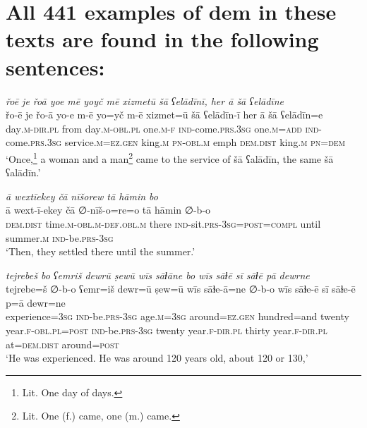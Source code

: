 \chapter{All 441 examples of dem in these texts are found in the following sentences:}

\ea \label{ZB.1}
\textit{řoē je řoā yoe mē yoyč mē xizmetū šā ʕelādīnī, her ā šā ʕelādīne} \\ 
\gll řo-ē je řo-ā yo-e m-ē yo=yč m-ē xizmet=ū šā ʕelādīn-ī her ā šā ʕelādīn=e \\ 
 day\textsc{.m}\textsc{-dir}\textsc{.pl} from day\textsc{.m}\textsc{-obl}\textsc{.pl} one\textsc{.m}\textsc{-f} \textsc{ind-}come\textsc{.prs}\textsc{.3sg} one\textsc{.m}\textsc{=add} \textsc{ind-}come\textsc{.prs}\textsc{.3sg} service\textsc{.m}\textsc{\textsc{=ez.gen}} king\textsc{.m} \textsc{pn}\textsc{-obl}\textsc{.m} emph \textsc{dem.dist} king\textsc{.m} \textsc{pn}\textsc{=dem} \\ 
\glt `Once,\footnote{Lit. One day of days.} a woman and a man\footnote{Lit. One (f.) came, one (m.) came.} came to the service of šā ʕalādīn, the same šā ʕalādīn.'
\z 
 
\ea \label{ZB.6}
\textit{ā wextīekey čā nīšorew tā hāmin bo} \\ 
\gll ā wext-ī-ekey čā ∅-nīš-o=re=o tā hāmin ∅-b-o \\ 
 \textsc{dem.dist} time\textsc{.m}\textsc{-obl}\textsc{.m}\textsc{-def}\textsc{.obl}\textsc{.m} there \textsc{ind-}sit\textsc{.prs}\textsc{-3sg}\textsc{=\textsc{post}}\textsc{=compl} until summer\textsc{.m} \textsc{ind-}be\textsc{.prs}\textsc{-3sg} \\ 
\glt `Then, they settled there until the summer.'
\z 
 
\ea \label{ZB.12}
\textit{tejrebeš bo ʕemriš dewrū ṣewū wīs sāɫāne bo wīs sāɫē sī sāɫē pā dewrne} \\ 
\gll tejrebe=š ∅-b-o ʕemr=iš dewr=ū ṣew=ū wīs sāɫe-ā=ne ∅-b-o wīs sāɫe-ē sī sāɫe-ē p=ā dewr=ne \\ 
 experience\textsc{=3sg} \textsc{ind-}be\textsc{.prs}\textsc{-3sg} age\textsc{.m}\textsc{=3sg} around\textsc{\textsc{=ez.gen}} hundred=and twenty year\textsc{.f}\textsc{-obl}\textsc{.pl}\textsc{=\textsc{post}} \textsc{ind-}be\textsc{.prs}\textsc{-3sg} twenty year\textsc{.f}\textsc{-dir}\textsc{.pl} thirty year\textsc{.f}\textsc{-dir}\textsc{.pl} at=\textsc{dem.dist} around\textsc{=\textsc{post}} \\ 
\glt `He was experienced. He was around 120 years old, about 120 or 130,'
\z 
 
